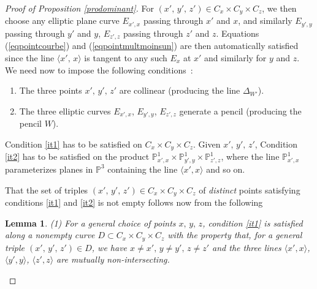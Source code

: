 \documentclass[10pt]{article}
\newtheorem{lemm}[theo]{Lemma}
\begin{document}
\begin{proof}[Proof of Proposition \ref{prodominant}]
 For $(x',\,y',\,z')\in C_x\times C_y\times C_z$, we then choose  any elliptic plane curve $E_{x',x}$  passing through $x'$ and $x$, and similarly $E_{y',y}$  passing through $y'$ and $y$, $E_{z',z}$  passing through $z'$ and $z$.
Equations (\ref{eqpointcourbe}) and (\ref{eqpointmultmoinsun}) are then automatically satisfied since the line $\langle x',\,x\rangle$ is tangent to any such $E_x$ at $x'$ and similarly for $y$ and $z$. We need now  to impose the following  conditions~:
\begin{enumerate}
\item \label{it1} The three points $x',\,y',\,z'$ are collinear (producing the line $\Delta_{W'}$).
\item \label{it2} The three elliptic curves $E_{x',x}$, $E_{y',y}$, $E_{z',z}$ generate a pencil (producing the  pencil $W$).

\end{enumerate}
Condition \ref{it1} has to be satisfied on $C_x\times C_y\times C_z$. Given $x',\,y',\,z'$, Condition \ref{it2} has to be satisfied on
the product $\mathbb{P}^1_{x',x}\times \mathbb{P}^1_{y',y}\times \mathbb{P}^1_{z',z}$, where the line $\mathbb{P}^1_{x',x}$  parameterizes planes in $\mathbb{P}^3$ containing the line $\langle x',x\rangle$  and so on.

That the set of triples $(x',\,y',\,z')\in C_x\times C_y\times C_z$ of {\it distinct } points satisfying conditions \ref{it1} and \ref{it2} is not empty  follows now from the following
\begin{lemm} (1) For a general choice of points $x,\,y,\,z$, condition \ref{it1} is satisfied along a nonempty curve $D\subset C_x\times C_y\times C_z$ with the property that, for a general triple $(x',\,y',\,z')\in D$, we have $x\not=x',\,y\not=y',\,z\not=z'$ and the three lines  $\langle x',x\rangle$, $\langle y',y\rangle$, $\langle z',z\rangle$ are mutually non-intersecting.


\end{lemm}
\end{proof}
\end{document}
